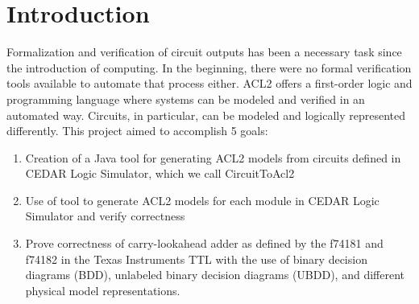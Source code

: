 \documentclass[fleqn,10pt]{SelfArx} %
\affiliation{\textsuperscript{1}\textit{Department of Computer Science, University of Texas at Austin}} %
\begin{document}
\flushbottom %

\maketitle %

\tableofcontents %

\thispagestyle{empty} %


\section*{Introduction} %

Formalization and verification of circuit outputs has been a necessary task since the 
introduction of computing. In the beginning, there were no formal verification tools available 
to automate that process either. ACL2 offers a first-order logic and programming language
where systems can be modeled and verified in an automated way. Circuits, in particular, can 
be modeled and logically represented differently. 
This project aimed to accomplish 5 goals:

\begin{enumerate}

\item Creation of a Java tool for generating ACL2 models from circuits defined in CEDAR Logic Simulator, which we call CircuitToAcl2
\item Use of tool to generate ACL2 models for each module in CEDAR Logic Simulator and verify correctness
\item Prove correctness of carry-lookahead adder as defined by the f74181 and f74182 in the Texas Instruments TTL
with the use of binary decision diagrams (BDD), unlabeled binary decision diagrams (UBDD), and different
physical model representations. 
\end{enumerate}
\end{document}
